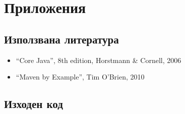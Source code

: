 \chapter{Приложения}
\section{Използвана литература}
\begin{itemize}
  \item "`Core Java"', 8th edition, Horstmann \& Cornell, 2006
  \item "`Maven by Example"', Tim O'Brien, 2010
\end{itemize}
\section{Изходен код}
